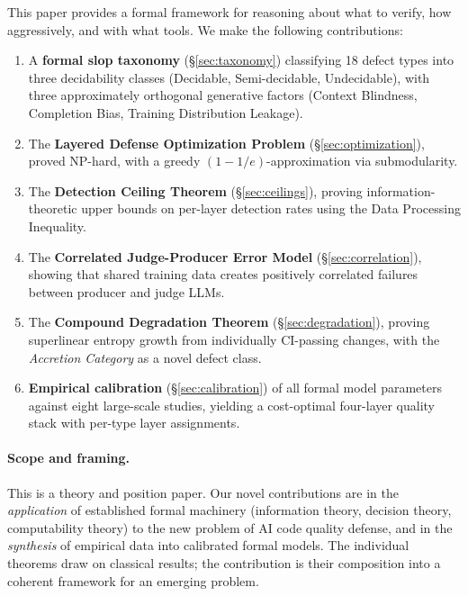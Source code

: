 \documentclass[11pt, a4paper, copyright]{googledeepmind}
\begin{document}
This paper provides a formal framework for reasoning about what to verify, how aggressively, and with what tools. We make the following contributions:

\begin{enumerate}
\item A \textbf{formal slop taxonomy} (\S\ref{sec:taxonomy}) classifying 18 defect types into three decidability classes (Decidable, Semi-decidable, Undecidable), with three approximately orthogonal generative factors (Context Blindness, Completion Bias, Training Distribution Leakage).

\item The \textbf{Layered Defense Optimization Problem} (\S\ref{sec:optimization}), proved NP-hard, with a greedy $(1-1/e)$-approximation via submodularity.

\item The \textbf{Detection Ceiling Theorem} (\S\ref{sec:ceilings}), proving information-theoretic upper bounds on per-layer detection rates using the Data Processing Inequality.

\item The \textbf{Correlated Judge-Producer Error Model} (\S\ref{sec:correlation}), showing that shared training data creates positively correlated failures between producer and judge LLMs.

\item The \textbf{Compound Degradation Theorem} (\S\ref{sec:degradation}), proving superlinear entropy growth from individually CI-passing changes, with the \emph{Accretion Category} as a novel defect class.

\item \textbf{Empirical calibration} (\S\ref{sec:calibration}) of all formal model parameters against eight large-scale studies, yielding a cost-optimal four-layer quality stack with per-type layer assignments.
\end{enumerate}

\paragraph{Scope and framing.} This is a theory and position paper. Our novel contributions are in the \emph{application} of established formal machinery (information theory, decision theory, computability theory) to the new problem of AI code quality defense, and in the \emph{synthesis} of empirical data into calibrated formal models. The individual theorems draw on classical results; the contribution is their composition into a coherent framework for an emerging problem.
\end{document}

